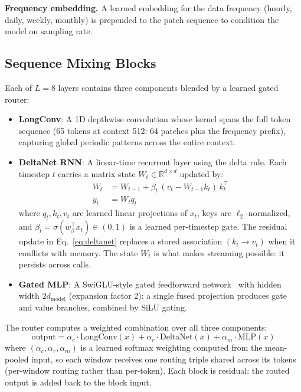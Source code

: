 \documentclass[11pt]{article}
\begin{document}
\textbf{Frequency embedding.} A learned embedding for the data frequency (hourly, daily, weekly, monthly) is prepended to the patch sequence to condition the model on sampling rate.

\subsection{Sequence Mixing Blocks}
\label{sec:mixing}

Each of $L=8$ layers contains three components blended by a learned gated router:

\begin{itemize}
\item \textbf{LongConv}: A 1D depthwise convolution whose kernel spans the full token sequence (65 tokens at context 512: 64 patches plus the frequency prefix), capturing global periodic patterns across the entire context.
\item \textbf{DeltaNet RNN}: A linear-time recurrent layer using the delta rule. Each timestep $t$ carries a matrix state $W_t \in \mathbb{R}^{d \times d}$ updated by:
\begin{align}
W_t &= W_{t-1} + \beta_t \,(v_t - W_{t-1} k_t)\, k_t^\top \label{eq:deltanet}\\
y_t &= W_t q_t
\end{align}
where $q_t, k_t, v_t$ are learned linear projections of $x_t$, keys are $\ell_2$-normalized, and $\beta_t = \sigma(w_\beta^\top x_t) \in (0,1)$ is a learned per-timestep gate. The residual update in Eq.~\ref{eq:deltanet} replaces a stored association $(k_t \to v_t)$ when it conflicts with memory. The state $W_t$ is what makes streaming possible: it persists across calls.
\item \textbf{Gated MLP}: A SwiGLU-style gated feedforward network~\cite{swiglu} with hidden width $2d_{\text{model}}$ (expansion factor 2): a single fused projection produces gate and value branches, combined by SiLU gating.
\end{itemize}

The router computes a weighted combination over all three components:
\begin{equation}
\text{output} = \alpha_c \cdot \text{LongConv}(x) + \alpha_r \cdot \text{DeltaNet}(x) + \alpha_m \cdot \text{MLP}(x)
\label{eq:router}
\end{equation}
where $(\alpha_c, \alpha_r, \alpha_m)$ is a learned softmax weighting computed from the mean-pooled input, so each window receives one routing triple shared across its tokens (per-window routing rather than per-token). Each block is residual: the routed output is added back to the block input.
\end{document}

